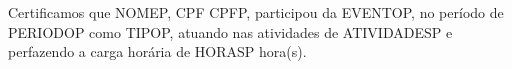 Certificamos que NOMEP, CPF CPFP, participou da EVENTOP, no período de PERIODOP como TIPOP, atuando nas atividades de ATIVIDADESP e perfazendo a carga horária de HORASP hora(s).
